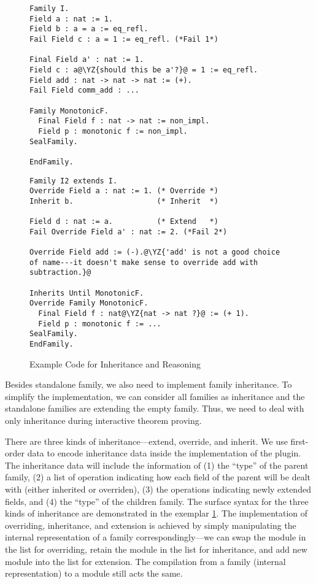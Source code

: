\begin{figure}[!htb]
  \begin{minipage}[t]{0.45\linewidth}
\begin{verbatim}
Family I.
Field a : nat := 1.
Field b : a = a := eq_refl.
Fail Field c : a = 1 := eq_refl. (*Fail 1*)

Final Field a' : nat := 1.
Field c : a@\YZ{should this be a'?}@ = 1 := eq_refl.
Field add : nat -> nat -> nat := (+).
Fail Field comm_add : ...

Family MonotonicF.
  Final Field f : nat -> nat := non_impl.
  Field p : monotonic f := non_impl.
SealFamily. 

EndFamily.
\end{verbatim}
  \end{minipage}
\begin{minipage}[t]{0.45\linewidth}
\begin{verbatim}
Family I2 extends I.
Override Field a : nat := 1. (* Override *)
Inherit b.                   (* Inherit  *)

Field d : nat := a.          (* Extend   *)
Fail Override Field a' : nat := 2. (*Fail 2*)

Override Field add := (-).@\YZ{'add' is not a good choice of name---it doesn't make sense to override add with subtraction.}@

Inherits Until MonotonicF.
Override Family MonotonicF.
  Final Field f : nat@\YZ{nat -> nat ?}@ := (+ 1).
  Field p : monotonic f := ...
SealFamily. 
EndFamily.
\end{verbatim}
  \end{minipage}
  \caption{Example Code for Inheritance and Reasoning}\label{fig:plugin-example3}
\end{figure}

Besides standalone family, we also need to implement family inheritance.
To simplify the implementation, we can consider all families as
inheritance and the standalone families are extending the empty family.
Thus, we need to deal with only inheritance during interactive theorem proving.


There are three kinds of inheritance---extend, override, and inherit. We
use first-order data to encode inheritance data inside the
implementation of the plugin. The inheritance data will include the
information of (1) the ``type'' of the parent family, (2) a list of
operation indicating how each field of the parent will be dealt with
(either inherited or overriden), (3) the operations indicating newly
extended fields, and (4) the ``type'' of the children family.
The surface syntax for the three kinds of inheritance
are demonstrated in the exemplar \cref*{fig:plugin-example3}. The
implementation of overriding, inheritance, and extension is achieved by
simply manipulating the internal representation of a family
correspondingly---we can swap the module in the list for overriding,
retain the module in the list for inheritance, and add new module into
the list for extension. The compilation from a family (internal
representation) to a module still acts the same.

